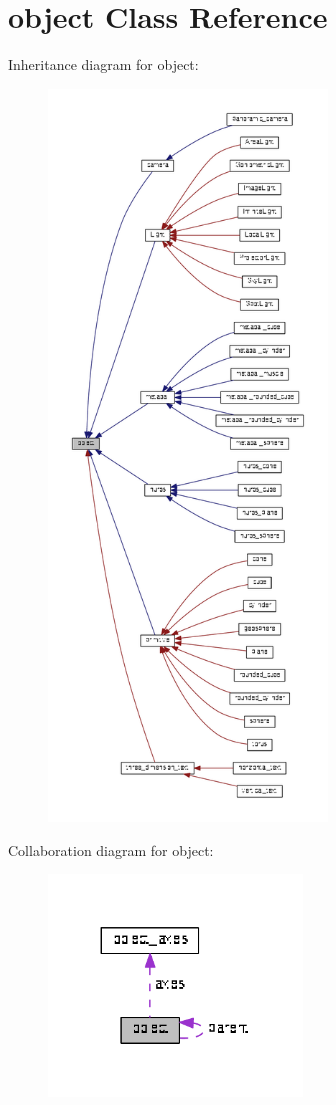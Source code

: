 \hypertarget{classobject}{}\section{object Class Reference}
\label{classobject}


Inheritance diagram for object\+:
\nopagebreak
\begin{figure}[H]
\begin{center}
\leavevmode
\includegraphics[height=550pt]{classobject__inherit__graph}
\end{center}
\end{figure}


Collaboration diagram for object\+:\nopagebreak
\begin{figure}[H]
\begin{center}
\leavevmode
\includegraphics[width=191pt]{classobject__coll__graph}
\end{center}
\end{figure}
